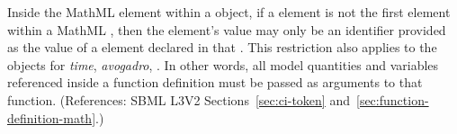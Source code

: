 Inside the  MathML element within a \FunctionDefinition
object, if a  element is not the first element within a MathML
, then the  element's value may only be an
identifier provided as the value of a  element declared in that
.  This restriction also applies to the 
objects for \emph{time}, \emph{avogadro}, .  In other words, all model
quantities and variables referenced inside a function definition must be
passed as arguments to that function.  (References: SBML L3V2
Sections~\ref{sec:ci-token} and~\ref{sec:function-definition-math}.)
